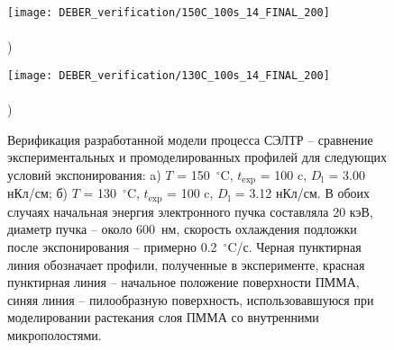 \begin{figure}[h]
	\begin{minipage}{0.48\textwidth}
		\texttt{[image: DEBER\_verification/150C\_100s\_14\_FINAL\_200]} \\
		\vspace{-12em} \\ ) \\ \vspace{12em}
	\end{minipage}
	\begin{minipage}{0.48\textwidth}
		\texttt{[image: DEBER\_verification/130C\_100s\_14\_FINAL\_200]} \\
		\vspace{-12em} \\ ) \\ \vspace{12em}
	\end{minipage}
	\vspace{-3.5em}
	\caption{
		Верификация разработанной модели процесса СЭЛТР -- сравнение экспериментальных и промоделированных профилей для следующих условий экспонирования: a) $T$ = 150~$^\circ$C, $t_\mathrm{exp}$ = 100 c, $D_\mathrm{l}$ = 3.00 нКл/см; б) $T$ = 130~$^\circ$C, $t_\mathrm{exp}$ = 100 c, $D_\mathrm{l}$ = 3.12 нКл/см.
		В обоих случаях начальная энергия электронного пучка составляла 20 кэВ, диаметр пучка -- около 600~нм, скорость охлаждения подложки после экспонирования -- примерно 0.2~$^\circ$C/с.
		Черная пунктирная линия обозначает профили, полученные в эксперименте, красная пунктирная линия -- начальное положение поверхности ПММА, синяя линия -- пилообразную поверхность, использовавшуюся при моделировании растекания слоя ПММА со внутренними микрополостями.}
	\label{fig:DEBER_2_profiles}
\end{figure}

